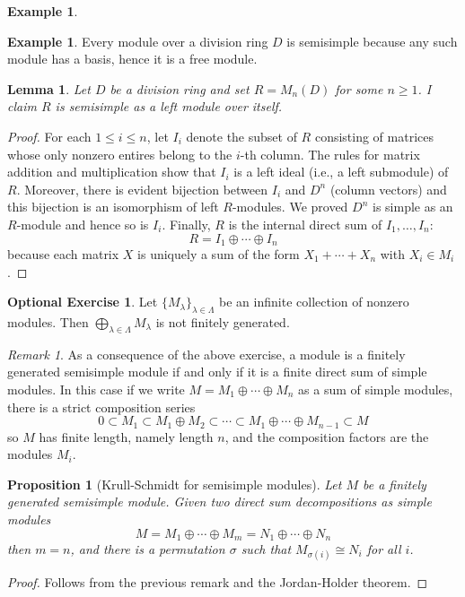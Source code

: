 \documentclass{amsart}[12pt]
\numberwithin{equation}{section}
\theoremstyle{plain} %
\newtheorem{lem}[equation]{Lemma}
\newtheorem{prop}[equation]{Proposition}
\theoremstyle{definition}
\newtheorem{ex}[equation]{Example}
\newtheorem{exer}[equation]{Optional Exercise}
\theoremstyle{remark}
\newtheorem{rem}[equation]{Remark}
\begin{document}
\begin{ex}
\begin{ex} Every module over a division ring $D$ is semisimple because any such module has a basis, hence it is a free module. %
\end{ex}


\begin{lem} 
\label{lem:matrixsemisimple}
Let $D$ be a division ring and set $R = M_n(D)$ for some $n \geq 1$. I claim $R$ is semisimple as a left module over itself. 
\end{lem}
  \begin{proof}
  For each $1 \leq i \leq n$, let $I_i$ denote the subset of $R$ consisting of matrices whose only nonzero entires belong to the $i$-th column.
The rules for matrix addition and multiplication show that $I_i$ is a left ideal (i.e., a left submodule) of $R$. Moreover, there is evident bijection between $I_i$ and $D^n$ (column vectors) and this bijection is an isomorphism of left $R$-modules. We proved $D^n$ is simple as an $R$-module  and hence so is $I_i$. Finally, $R$ is the internal direct sum of $I_1, \dots, I_n$:
\[
R=I_1\oplus \cdots \oplus I_n
\]
because 
 each matrix $X$ is uniquely a sum of the form $X_1 + \cdots + X_n$ with $X_i \in M_i$.
\end{proof}

\begin{exer} Let $\{M_\lambda\}_{\lambda\in \Lambda}$ be an infinite collection of nonzero modules. Then $\bigoplus_{\lambda\in \Lambda} M_\lambda$ is not finitely generated.
\end{exer}

\begin{rem} As a consequence of the above exercise, a module is a finitely generated semisimple module if and only if it is a finite direct sum of simple modules. In this case if we write $M=M_1 \oplus \cdots \oplus M_n$ as a sum of simple modules, there is a strict composition series
 \[0\subset M_1 \subset M_1 \oplus M_2 \subset \cdots \subset M_1 \oplus \cdots \oplus M_{n-1} \subset M\]
 so $M$ has finite length, namely length $n$, and the composition factors are the modules $M_i$.
 \end{rem}
 
 \begin{prop}[Krull-Schmidt for semisimple modules]
 Let $M$ be a finitely generated semisimple module. Given two direct sum decompositions as simple modules
 \[ M = M_1 \oplus  \cdots  \oplus M_m = N_1 \oplus  \cdots  \oplus N_n\]
 then $m=n$, and there is a permutation $\sigma$ such that $M_{\sigma(i)} \cong N_i$ for all $i$.
 \end{prop}
\begin{proof} Follows from the previous remark and the Jordan-Holder theorem.
\end{proof}


\end{ex}
\end{document}
